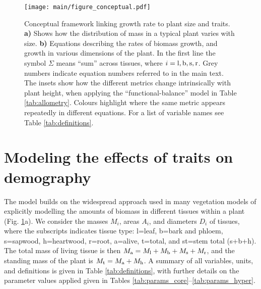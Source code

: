 \documentclass[9pt,twocolumn,twoside,lineno]{pnas-new}
\begin{document}
\begin{figure}[!ht]
\centering
\texttt{[image: main/figure\_conceptual.pdf]}
\caption{Conceptual framework linking growth rate to plant size and traits.
\textbf{a)} Shows how the distribution of mass in a typical plant varies with size.
\textbf{b)} Equations describing the rates of biomass growth, and growth in various dimensions of the plant. In the first line the symbol $\Sigma$ means ``sum'' across tissues, where $i = {\rm l,b,s,r}$. Grey numbers indicate equation numbers referred to in the main text. The insets show how the different metrics change intrinsically with plant height, when applying the ``functional-balance'' model in Table \ref{tab:allometry}. Colours highlight where the same metric appears repeatedly in different equations. For a list of variable names see Table \ref{tab:definitions}.}
\label{fig:conceptual}
\end{figure}

\section*{Modeling the effects of traits on demography}

The {\plant} model builds on the widespread approach used in many vegetation models of explicitly modelling the amounts of biomass in different tissues within a plant \citep[e.g.][]{Givnish-1988, Makela-1997, Moorcroft-2001, Sitch-2008, Falster-2011, King-2011, DeKauwe-2014} (Fig. \ref{fig:conceptual}a). We consider the masses $M_i$, areas $A_i$, and diameters $D_i$ of tissues, where the subscripts indicates tissue type: l=leaf, b=bark and phloem, s=sapwood, h=heartwood, r=root, a=alive, t=total, and st=stem total (s+b+h). The total mass of living tissue is then $M_{\rm a}=M_{\rm l}+M_{\rm b}+M_{\rm s}+M_{\rm r}$, and the standing mass of the plant is $M_{\rm t}=M_{\rm a}+M_{\rm h}$. A summary of all variables, units, and definitions is given in Table \ref{tab:definitions}, with further details on the parameter values applied given in Tables \ref{tab:params_core}--\ref{tab:params_hyper}.
\end{document}
